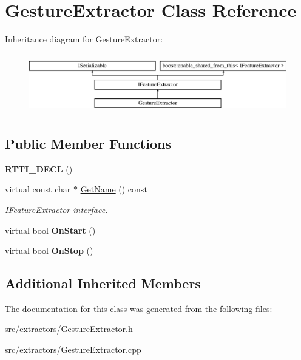 \hypertarget{class_gesture_extractor}{}\section{Gesture\+Extractor Class Reference}
\label{class_gesture_extractor}
Inheritance diagram for Gesture\+Extractor\+:\begin{figure}[H]
\begin{center}
\leavevmode
\includegraphics[height=2.625000cm]{class_gesture_extractor}
\end{center}
\end{figure}
\subsection*{Public Member Functions}
\begin{DoxyCompactItemize}
\item 
\mbox{\label{class_gesture_extractor_a9f1f7f89ddb994175e5118d25e8362c7}} 
{\bfseries R\+T\+T\+I\+\_\+\+D\+E\+CL} ()
\item 
\mbox{\label{class_gesture_extractor_a9ef26ad3dd52fd891884cfb91b799577}} 
virtual const char $\ast$ \hyperlink{class_gesture_extractor_a9ef26ad3dd52fd891884cfb91b799577}{Get\+Name} () const
\begin{DoxyCompactList}\small\item\em \hyperlink{class_i_feature_extractor}{I\+Feature\+Extractor} interface. \end{DoxyCompactList}\item 
\mbox{\label{class_gesture_extractor_a21246649d97810dbe17607e3e57fa425}} 
virtual bool {\bfseries On\+Start} ()
\item 
\mbox{\label{class_gesture_extractor_af4b63402b7b7e93600650b62638dfb0b}} 
virtual bool {\bfseries On\+Stop} ()
\end{DoxyCompactItemize}
\subsection*{Additional Inherited Members}


The documentation for this class was generated from the following files\+:\begin{DoxyCompactItemize}
\item 
src/extractors/Gesture\+Extractor.\+h\item 
src/extractors/Gesture\+Extractor.\+cpp\end{DoxyCompactItemize}
